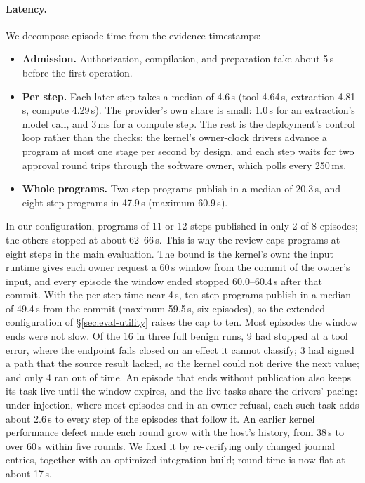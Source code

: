 \documentclass[letterpaper,twocolumn,10pt]{article}
\begin{document}
\paragraph{Latency.} We decompose episode time from the evidence
timestamps:
\begin{itemize}
\item \textbf{Admission.} Authorization, compilation, and preparation take
  about 5\,s before the first operation.
\item \textbf{Per step.} Each later step takes a median of 4.6\,s (tool
  4.64\,s, extraction 4.81\,s, compute 4.29\,s). The provider's own share
  is small: 1.0\,s for an extraction's model call, and 3\,ms for a compute
  step. The rest is the deployment's control loop rather than the checks:
  the kernel's owner-clock drivers advance a program at most one stage per
  second by design, and each step waits for two approval round trips
  through the software owner, which polls every 250\,ms.
\item \textbf{Whole programs.} Two-step programs publish in a median of
  20.3\,s, and eight-step programs in 47.9\,s (maximum 60.9\,s).
\end{itemize}
In our configuration, programs of 11 or 12 steps published in only 2 of
8 episodes; the others stopped at about 62--66\,s. This is why the review caps programs at
eight steps in the main evaluation.
The bound is the kernel's own: the input runtime gives each owner request
a 60\,s window from the commit of the owner's input, and every episode the
window ended stopped 60.0--60.4\,s after that commit. With the per-step
time near 4\,s, ten-step programs publish in a median of 49.4\,s from the
commit (maximum 59.5\,s, six episodes), so the extended configuration of
\S\ref{sec:eval-utility} raises the cap to ten. Most episodes the window
ends were not slow. Of the 16 in three full benign runs, 9 had stopped at a
tool error, where the endpoint fails closed on an effect it cannot
classify; 3 had signed a path that the source result lacked, so the kernel
could not derive the next value; and only 4 ran out of time. An episode
that ends without publication also keeps its task live until the window
expires, and the live tasks share the drivers' pacing: under injection,
where most episodes end in an owner refusal, each such task adds about
2.6\,s to every step of the episodes that follow it.
An earlier kernel performance defect made each round grow with the
host's history, from 38\,s to over 60\,s within five rounds. We fixed it
by re-verifying only changed journal entries, together with an optimized
integration build; round time is now flat at about 17\,s.
\end{document}

